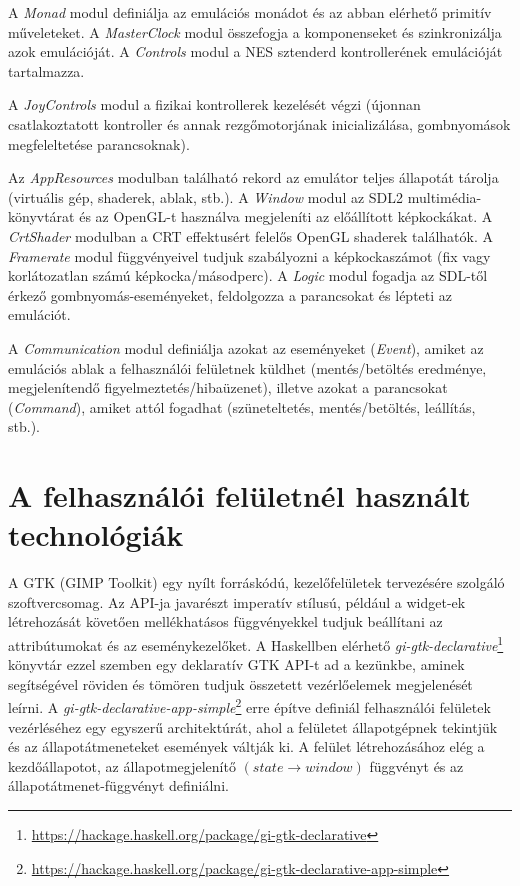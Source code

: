 A \emph{Monad} modul definiálja az emulációs monádot és az abban elérhető primitív műveleteket.
A \emph{MasterClock} modul összefogja a komponenseket és szinkronizálja azok emulációját.
A \emph{Controls} modul a NES sztenderd kontrollerének emulációját tartalmazza.   

A \emph{JoyControls} modul a fizikai kontrollerek kezelését végzi (újonnan csatlakoztatott kontroller és annak rezgőmotorjának inicializálása, gombnyomások megfeleltetése parancsoknak).

Az \emph{AppResources} modulban található rekord az emulátor teljes állapotát tárolja (virtuális gép, shaderek, ablak, stb.).
A \emph{Window} modul az SDL2 multimédia-könyvtárat és az OpenGL-t használva megjeleníti az előállított képkockákat. A \emph{CrtShader} modulban a CRT effektusért felelős OpenGL shaderek találhatók. A \emph{Framerate} modul függvényeivel tudjuk szabályozni a képkockaszámot (fix vagy korlátozatlan számú képkocka/másodperc). A \emph{Logic} modul fogadja az SDL-től érkező gombnyomás-eseményeket, feldolgozza a parancsokat és lépteti az emulációt.

A \emph{Communication} modul definiálja azokat az eseményeket (\emph{Event}), amiket az emulációs ablak a felhasználói felületnek küldhet (mentés/betöltés eredménye, megjelenítendő figyelmeztetés/hibaüzenet), illetve azokat a parancsokat (\emph{Command}), amiket attól fogadhat (szüneteltetés, mentés/betöltés, leállítás, stb.).

\section{A felhasználói felületnél használt technológiák}

A GTK (GIMP Toolkit) egy nyílt forráskódú, kezelőfelületek tervezésére szolgáló szoftvercsomag.
Az API-ja javarészt imperatív stílusú, például a widget-ek létrehozását követően mellékhatásos függvényekkel tudjuk beállítani az attribútumokat és az eseménykezelőket. A Haskellben elérhető \emph{gi-gtk-declarative}\footnote{\url{https://hackage.haskell.org/package/gi-gtk-declarative}} könyvtár ezzel szemben egy deklaratív GTK API-t ad a kezünkbe, aminek segítségével röviden és tömören tudjuk összetett vezérlőelemek megjelenését leírni. 
A \emph{gi-gtk-declarative-app-simple}\footnote{\url{https://hackage.haskell.org/package/gi-gtk-declarative-app-simple}} erre építve definiál felhasználói felületek vezérléséhez egy egyszerű architektúrát, ahol a felületet állapotgépnek tekintjük és az állapotátmeneteket események váltják ki. A felület létrehozásához elég a kezdőállapotot, az állapotmegjelenítő $(state \rightarrow window)$ függvényt és az állapotátmenet-függvényt definiálni.

